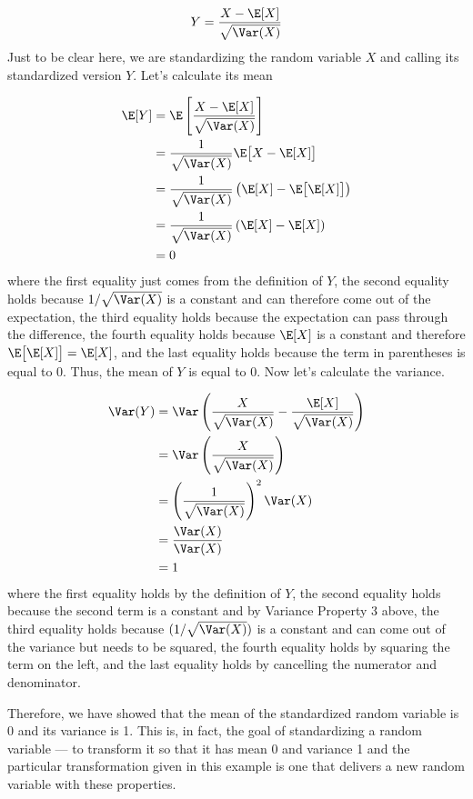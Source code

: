 \documentclass[
  letterpaper,
  DIV=11,
  numbers=noendperiod]{scrreprt}
\begin{document}
\[ 
  Y = \frac{ X - \E[X]}{\sqrt{\Var(X)}}
\] Just to be clear here, we are standardizing the random variable \(X\)
and calling its standardized version \(Y\). Let's calculate its mean

\[
  \begin{aligned}
    \E[Y] &= \E\left[ \frac{X - \E[X]}{\sqrt{\Var(X)}} \right] \\
    &= \frac{1}{\sqrt{\Var(X)}} \E\big[ X - \E[X] \big] \\
    &= \frac{1}{\sqrt{\Var(X)}} \left( \E[X] - \E\big[\E[X]\big] \right) \\
    &= \frac{1}{\sqrt{\Var(X)}} \left( \E[X] - \E[X] \right) \\
    &= 0
  \end{aligned}
\] where the first equality just comes from the definition of \(Y\), the
second equality holds because \(1/\sqrt{\Var(X)}\) is a constant and can
therefore come out of the expectation, the third equality holds because
the expectation can pass through the difference, the fourth equality
holds because \(\E[X]\) is a constant and therefore
\(\E\big[\E[X]\big] = \E[X]\), and the last equality holds because the
term in parentheses is equal to 0. Thus, the mean of \(Y\) is equal to
0. Now let's calculate the variance.

\[
  \begin{aligned}
  \Var(Y) &= \Var\left( \frac{X}{\sqrt{\Var(X)}} - \frac{\E[X]}{\sqrt{\Var(X)}} \right) \\
  &= \Var\left( \frac{X}{\sqrt{\Var(X)}}\right) \\
  &= \left( \frac{1}{\sqrt{\Var(X)}} \right)^2 \Var(X) \\
  &= \frac{\Var(X)}{\Var(X)} \\
  &= 1
  \end{aligned}
\] where the first equality holds by the definition of \(Y\), the second
equality holds because the second term is a constant and by Variance
Property 3 above, the third equality holds because
\((1/\sqrt{\Var(X)})\) is a constant and can come out of the variance
but needs to be squared, the fourth equality holds by squaring the term
on the left, and the last equality holds by cancelling the numerator and
denominator.

Therefore, we have showed that the mean of the standardized random
variable is 0 and its variance is 1. This is, in fact, the goal of
standardizing a random variable --- to transform it so that it has mean
0 and variance 1 and the particular transformation given in this example
is one that delivers a new random variable with these properties.
\end{document}
